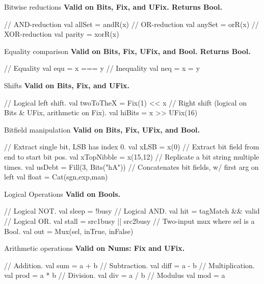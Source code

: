 \documentclass[xcolor=pdflatex,dvipsnames,table]{beamer}
\begin{document}
\begin{frame}[fragile]{Bitwise reductions}
\textbf{Valid on Bits, Fix, and UFix.  Returns Bool.}
\begin{scala}
// AND-reduction 
val allSet = andR(x)  
// OR-reduction
val anySet = orR(x)   
// XOR-reduction 
val parity = xorR(x)  
\end{scala}
\end{frame}

\begin{frame}[fragile]{Equality comparison}
\textbf{Valid on Bits, Fix, UFix, and Bool. Returns Bool.}
\begin{scala}
// Equality
val equ = x === y 
// Inequality 
val neq = x = y   
\end{scala}
\end{frame}

\begin{frame}[fragile]{Shifts}
\textbf{Valid on Bits, Fix, and UFix.}
\begin{scala}
// Logical left shift.
val twoToTheX = Fix(1) << x   
// Right shift (logical on Bits & UFix, arithmetic on Fix).
val hiBits    = x >> UFix(16) 
\end{scala}
\end{frame}

\begin{frame}[fragile]{Bitfield manipulation}
\textbf{Valid on Bits, Fix, UFix, and Bool.}
\begin{scala}
// Extract single bit, LSB has index 0.
val xLSB       = x(0)                
// Extract bit field  from end to start bit pos. 
val xTopNibble = x(15,12)            
// Replicate a bit string multiple times.
val usDebt     = Fill(3, Bits("hA")) 
// Concatenates bit fields, w/ first arg on left
val float      = Cat(sgn,exp,man)    
\end{scala}
\end{frame}

\begin{frame}[fragile]{Logical Operations}
\textbf{Valid on Bools. }
\begin{scala}
// Logical NOT. 
val sleep = !busy                     
// Logical AND.
val hit   = tagMatch && valid         
// Logical OR.
val stall = src1busy || src2busy      
// Two-input mux where sel is a Bool.  
val out   = Mux(sel, inTrue, inFalse) 
\end{scala}
\end{frame}

\begin{frame}[fragile]{Arithmetic operations}
\textbf{Valid on Nums: Fix and UFix. }
\begin{scala}
// Addition. 
val sum  = a + b  
// Subtraction.
val diff = a - b  
// Multiplication. 
val prod = a * b  
// Division.
val div  = a / b  
// Modulus
val mod  = a %
\end{scala}
\end{frame}
\end{document}
